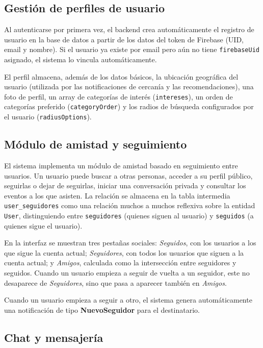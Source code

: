 \subsection{Gestión de perfiles de usuario}

Al autenticarse por primera vez, el backend crea automáticamente el registro de usuario en la base de datos a partir de los datos del token de Firebase (UID, email y nombre). Si el usuario ya existe por email pero aún no tiene \texttt{firebaseUid} asignado, el sistema lo vincula automáticamente.

El perfil almacena, además de los datos básicos, la ubicación geográfica del usuario (utilizada por las notificaciones de cercanía y las recomendaciones), una foto de perfil, un array de categorías de interés (\texttt{intereses}), un orden de categorías preferido (\texttt{categoryOrder}) y los radios de búsqueda configurados por el usuario (\texttt{radiusOptions}).

\subsection{Módulo de amistad y seguimiento}

El sistema implementa un módulo de amistad basado en seguimiento entre usuarios. Un usuario puede buscar a otras personas, acceder a su perfil público, seguirlas o dejar de seguirlas, iniciar una conversación privada y consultar los eventos a los que asisten. La relación se almacena en la tabla intermedia \texttt{user\_seguidores} como una relación muchos a muchos reflexiva sobre la entidad \texttt{User}, distinguiendo entre \texttt{seguidores} (quienes siguen al usuario) y \texttt{seguidos} (a quienes sigue el usuario).

En la interfaz se muestran tres pestañas sociales: \textit{Seguidos}, con los usuarios a los que sigue la cuenta actual; \textit{Seguidores}, con todos los usuarios que siguen a la cuenta actual; y \textit{Amigos}, calculada como la intersección entre seguidores y seguidos. Cuando un usuario empieza a seguir de vuelta a un seguidor, este no desaparece de \textit{Seguidores}, sino que pasa a aparecer también en \textit{Amigos}.

Cuando un usuario empieza a seguir a otro, el sistema genera automáticamente una notificación de tipo \textbf{NuevoSeguidor} para el destinatario.

\subsection{Chat y mensajería}

